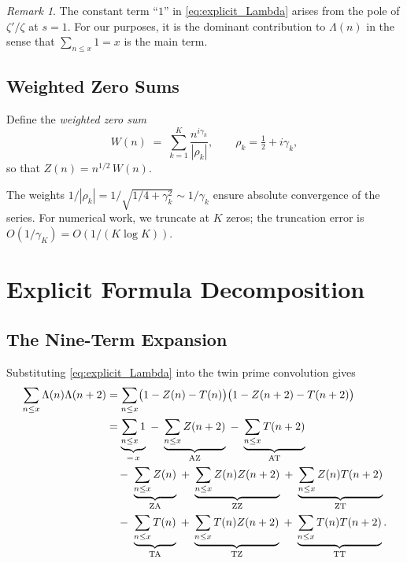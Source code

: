 \documentclass[11pt,a4paper]{article}
\theoremstyle{remark}
\newtheorem{remark}[theorem]{Remark}
\begin{document}
\begin{remark}
The constant term ``$1$'' in \eqref{eq:explicit_Lambda} arises from the pole of $\zeta'/\zeta$ at $s=1$.
For our purposes, it is the dominant contribution to $\Lambda(n)$ in the sense that $\sum_{n\le x}1=x$ is the main term.
\end{remark}

\subsection{Weighted Zero Sums}\label{sec:weighted}

Define the \emph{weighted zero sum}
\begin{equation}\label{eq:W_def}
W(n) \;=\; \sum_{k=1}^{K}\frac{n^{i\gamma_k}}{|\rho_k|}, \qquad \rho_k=\tfrac{1}{2}+i\gamma_k,
\end{equation}
so that $Z(n)=n^{1/2}\,W(n)$.

The weights $1/|\rho_k|=1/\sqrt{1/4+\gamma_k^2}\sim 1/\gamma_k$ ensure absolute convergence of the series.
For numerical work, we truncate at $K$ zeros; the truncation error is $O(1/\gamma_K)=O(1/(K\log K))$.

\section{Explicit Formula Decomposition}\label{sec:decomp}

\subsection{The Nine-Term Expansion}\label{sec:nine_terms}

Substituting \eqref{eq:explicit_Lambda} into the twin prime convolution gives
\begin{align}
\sum_{n\le x}\Lambda(n)\Lambda(n+2)
&= \sum_{n\le x}\bigl(1-Z(n)-T(n)\bigr)\bigl(1-Z(n+2)-T(n+2)\bigr)\notag\\
&= \underbrace{\sum_{n\le x}1}_{=\,x}
\;-\; \underbrace{\sum_{n\le x}Z(n+2)}_{\mathrm{AZ}}
\;-\; \underbrace{\sum_{n\le x}T(n+2)}_{\mathrm{AT}}\notag\\
&\quad -\; \underbrace{\sum_{n\le x}Z(n)}_{\mathrm{ZA}}
\;+\; \underbrace{\sum_{n\le x}Z(n)Z(n+2)}_{\mathrm{ZZ}}
\;+\; \underbrace{\sum_{n\le x}Z(n)T(n+2)}_{\mathrm{ZT}}\notag\\
&\quad -\; \underbrace{\sum_{n\le x}T(n)}_{\mathrm{TA}}
\;+\; \underbrace{\sum_{n\le x}T(n)Z(n+2)}_{\mathrm{TZ}}
\;+\; \underbrace{\sum_{n\le x}T(n)T(n+2)}_{\mathrm{TT}}.
\label{eq:nine_terms}
\end{align}
\end{document}
